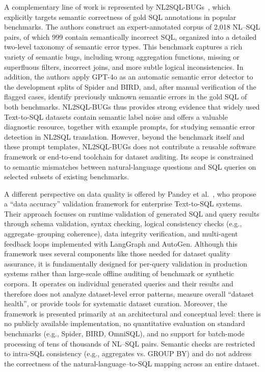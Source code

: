 \documentclass[]{einformatica}
\begin{document}
A complementary line of work is represented by NL2SQL-BUGs~\cite{liu2025nl2sqlbugs}, which explicitly targets semantic correctness of gold SQL annotations in popular benchmarks. The authors construct an expert-annotated corpus of 2,018 NL--SQL pairs, of which 999 contain semantically incorrect SQL, organized into a detailed two-level taxonomy of semantic error types. This benchmark captures a rich variety of semantic bugs, including wrong aggregation functions, missing or superfluous filters, incorrect joins, and more subtle logical inconsistencies. In addition, the authors apply GPT-4o as an automatic semantic error detector to the development splits of Spider and BIRD, and, after manual verification of the flagged cases, identify previously unknown semantic errors in the gold SQL of both benchmarks. NL2SQL-BUGs thus provides strong evidence that widely used Text-to-SQL datasets contain semantic label noise and offers a valuable diagnostic resource, together with example prompts, for studying semantic error detection in NL2SQL translation. However, beyond the benchmark itself and these prompt templates, NL2SQL-BUGs does not contribute a reusable software framework or end-to-end toolchain for dataset auditing. Its scope is constrained to semantic mismatches between natural-language questions and SQL queries on selected subsets of existing benchmarks.

A different perspective on data quality is offered by Pandey et al.~\cite{pandey2024validation}, who propose a ``data accuracy'' validation framework for enterprise Text-to-SQL systems. Their approach focuses on runtime validation of generated SQL and query results through schema validation, syntax checking, logical consistency checks (e.g., aggregate--grouping coherence), data integrity verification, and multi-agent feedback loops implemented with LangGraph and AutoGen. Although this framework uses several components like those needed for dataset quality assurance, it is fundamentally designed for per-query validation in production systems rather than large-scale offline auditing of benchmark or synthetic corpora. It operates on individual generated queries and their results and therefore does not analyze dataset-level error patterns, measure overall ``dataset health'', or provide tools for systematic dataset curation. Moreover, the framework is presented primarily at an architectural and conceptual level: there is no publicly available implementation, no quantitative evaluation on standard benchmarks (e.g., Spider, BIRD, OmniSQL), and no support for batch-mode processing of tens of thousands of NL--SQL pairs. Semantic checks are restricted to intra-SQL consistency (e.g., aggregates vs. GROUP BY) and do not address the correctness of the natural-language--to-SQL mapping across an entire dataset.
\end{document}
